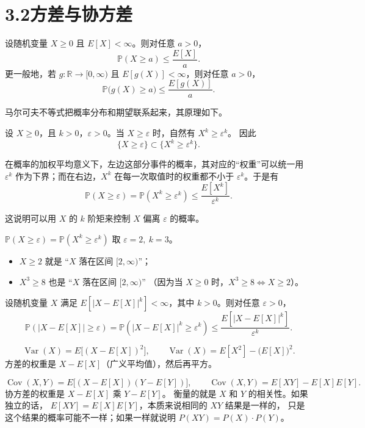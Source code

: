 \section*{3.2方差与协方差}
\begin{definition}[马尔可夫不等式]
设随机变量 $X\ge 0$ 且 $E[X]<\infty$。则对任意 $a>0$，
\[
\mathbb P(X\ge a)\le \frac{E[X]}{a}.
\]
更一般地，若 $g:\mathbb R\to[0,\infty)$ 且 $E[g(X)]<\infty$，则对任意 $a>0$，
\[
\mathbb P\!\big(g(X)\ge a\big)\le \frac{E[g(X)]}{a}.
\]
\end{definition}
\begin{note}
   马尔可夫不等式把概率分布和期望联系起来，其原理如下。

设 $X\ge 0$，且 $k>0$，$\varepsilon>0$。当 $X\ge \varepsilon$ 时，自然有
$X^{k}\ge \varepsilon^{k}$。
因此
\[
\{X\ge \varepsilon\}\subset \{X^{k}\ge \varepsilon^{k}\}.
\]

在概率的加权平均意义下，左边这部分事件的概率，其对应的“权重”可以统一用
$\varepsilon^{k}$ 作为下界；而在右边，$X^{k}$ 在每一次取值时的权重都不小于
$\varepsilon^{k}$。于是有
\[
\mathbb P(X\ge \varepsilon)
=\mathbb P(X^{k}\ge \varepsilon^{k})
\le \frac{E[X^{k}]}{\varepsilon^{k}}.
\]

这说明可以用 $X$ 的 $k$ 阶矩来控制 $X$ 偏离 $\varepsilon$ 的概率。
\end{note}
\begin{example}
$
\mathbb P(X\ge \varepsilon)
=\mathbb P(X^{k}\ge \varepsilon^{k})

$
取 $\varepsilon=2,\ k=3$。
\begin{itemize}
  \item $X\ge 2$ 就是 “$X$ 落在区间 $[2,\infty)$”；
  \item $X^3\ge 8$ 也是 “$X$ 落在区间 $[2,\infty)$”
  （因为当 $X\ge 0$ 时，$X^3\ge 8 \Longleftrightarrow X\ge 2$）。
\end{itemize}
\end{example}
\begin{definition}[切比雪夫]
    设随机变量 $X$ 满足 $E\!\left[|X-E[X]|^{k}\right]<\infty$，其中 $k>0$。则对任意 $\varepsilon>0$，
\[
\mathbb P\!\left(|X-E[X]|\ge \varepsilon\right)
=\mathbb P\!\left(|X-E[X]|^{k}\ge \varepsilon^{k}\right)
\le \frac{E\!\left[|X-E[X]|^{k}\right]}{\varepsilon^{k}}.
\]
\end{definition}
\begin{note}[方差与协方差]
\[
\operatorname{Var}(X)=E\!\big[(X-E[X])^2\big],
\qquad
\operatorname{Var}(X)=E[X^2]-\big(E[X]\big)^2.
\]
方差的权重是 $X-E[X]$（广义平均值），然后再平方。

\[
\operatorname{Cov}(X,Y)=E\!\big[(X-E[X])(Y-E[Y])\big],
\qquad
\operatorname{Cov}(X,Y)=E[XY]-E[X]E[Y].
\]
协方差的权重是 $X-E[X]$ 乘 $Y-E[Y]$。
衡量的就是 $X$ 和 $Y$ 的相关性。如果独立的话，
$E[XY]=E[X]E[Y]$，本质来说相同的 $XY$ 结果是一样的，
只是这个结果的概率可能不一样；如果一样就说明
$P(XY)=P(X)\cdot P(Y)$。
\end{note}
